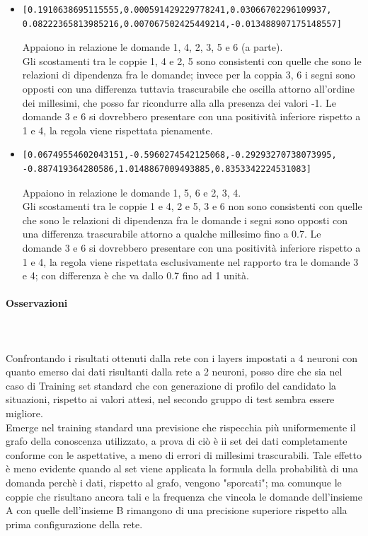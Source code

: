 \begin{itemize}
\item \begin{verbatim}[0.1910638695115555,0.000591429229778241,0.03066702296109937,
0.08222365813985216,0.007067502425449214,-0.013488907175148557]
\end{verbatim}
Appaiono in relazione le domande 1, 4, 2, 3, 5 e 6 (a parte).\\
Gli scostamenti tra le coppie 1, 4 e 2, 5 sono consistenti con quelle che sono le relazioni di dipendenza fra le domande; invece per la coppia 3, 6 i segni sono opposti con una differenza tuttavia trascurabile  che oscilla attorno all'ordine dei millesimi, che posso far ricondurre alla alla presenza dei valori -1.
Le domande 3 e 6 si dovrebbero presentare con una positivit\`a inferiore rispetto a 1 e 4, la regola viene rispettata pienamente.

\item \begin{verbatim}[0.06749554602043151,-0.5960274542125068,-0.29293270738073995,
-0.887419364280586,1.0148867009493885,0.8353342224531083]
\end{verbatim}
Appaiono in relazione le domande 1, 5, 6 e 2, 3, 4.\\
Gli scostamenti tra le coppie 1 e 4, 2 e 5, 3 e 6 non sono consistenti con quelle che sono le relazioni di dipendenza fra le domande i segni sono opposti con una differenza trascurabile attorno a qualche millesimo fino a 0.7. 
Le domande 3 e 6 si dovrebbero presentare con una positivit\`a inferiore rispetto a 1 e 4, la regola viene rispettata  esclusivamente nel rapporto tra le domande 3 e 4; con differenza \`e che va dallo 0.7 fino ad 1 unit\`a.
\end{itemize}


\paragraph{Osservazioni}\mbox{}
\label{Osservazioni su rete a 2 neuroni per ciascuno dei 2 layers}
\\\\
\noindent
Confrontando i risultati ottenuti dalla rete con i layers impostati a 4 neuroni con quanto emerso dai dati risultanti dalla  rete a 2 neuroni, posso dire che sia nel caso di Training set standard che con generazione di profilo del candidato la situazioni, rispetto ai valori attesi, nel secondo gruppo di test sembra essere migliore.\\
Emerge nel training standard una previsione che rispecchia pi\`u uniformemente il grafo della conoscenza utilizzato, a prova di ci\`o  \`e ii set dei dati completamente conforme con le aspettative, a meno di errori di millesimi trascurabili. Tale effetto \`e meno evidente quando al set viene applicata la formula della probabilit\`a di una domanda perch\`e i dati, rispetto al grafo, vengono "sporcati"; ma comunque le coppie che risultano ancora tali e la frequenza che vincola le domande dell'insieme A con quelle dell'insieme B rimangono di una precisione superiore rispetto alla prima configurazione della rete.


